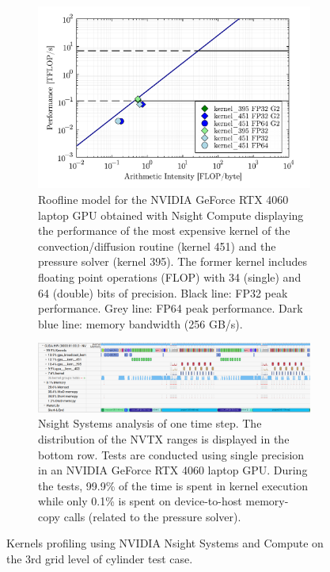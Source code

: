 \documentclass[10pt,a4paper]{article}
\begin{document}
\begin{figure}[!t]
  \centering
  \begin{subfigure}[t]{\linewidth}
    \centering
    \includegraphics[width=0.65\linewidth]{img/roofline_cylinder.pdf}
    \caption{Roofline model for the NVIDIA GeForce RTX 4060 laptop GPU obtained with Nsight Compute displaying the performance of the most expensive kernel of the convection/diffusion routine (kernel 451) and the pressure solver (kernel 395). The former kernel includes floating point operations (FLOP) with 34 (single) and 64 (double) bits of precision. Black line: FP32 peak performance. Grey line: FP64 peak performance. Dark blue line: memory bandwidth (256 GB/s).}
    \vspace*{1em}
  \end{subfigure}
  \begin{subfigure}[t]{\linewidth}
    \centering
    \includegraphics[width=\linewidth]{img/nsys_cylinder_profiling.png}
    \caption{Nsight Systems analysis of one time step. The distribution of the NVTX ranges is displayed in the bottom row. Tests are conducted using single precision in an NVIDIA GeForce RTX 4060 laptop GPU. During the tests, 99.9\% of the time is spent in kernel execution while only 0.1\% is spent on device-to-host memory-copy calls (related to the pressure solver).}
  \end{subfigure}
  \caption{Kernels profiling using NVIDIA Nsight Systems and Compute on the 3rd grid level of cylinder test case.}
\label{fig:profiling_nsight}
\end{figure}
\end{document}
